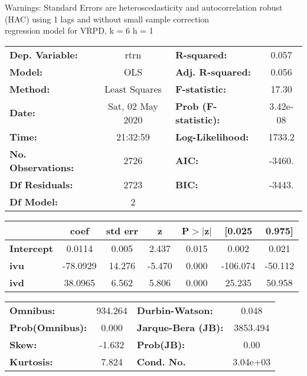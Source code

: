 Warnings: \newline
 [1] Standard Errors are heteroscedasticity and autocorrelation robust (HAC) using 1 lags and without small sample correction\\ 

regression model for VRPD, k = 6 h = 1\begin{center}
\begin{tabular}{lclc}
\toprule
\textbf{Dep. Variable:}    &       rtrn       & \textbf{  R-squared:         } &     0.057   \\
\textbf{Model:}            &       OLS        & \textbf{  Adj. R-squared:    } &     0.056   \\
\textbf{Method:}           &  Least Squares   & \textbf{  F-statistic:       } &     17.30   \\
\textbf{Date:}             & Sat, 02 May 2020 & \textbf{  Prob (F-statistic):} &  3.42e-08   \\
\textbf{Time:}             &     21:32:59     & \textbf{  Log-Likelihood:    } &    1733.2   \\
\textbf{No. Observations:} &        2726      & \textbf{  AIC:               } &    -3460.   \\
\textbf{Df Residuals:}     &        2723      & \textbf{  BIC:               } &    -3443.   \\
\textbf{Df Model:}         &           2      & \textbf{                     } &             \\
\bottomrule
\end{tabular}
\begin{tabular}{lcccccc}
                   & \textbf{coef} & \textbf{std err} & \textbf{z} & \textbf{P$> |$z$|$} & \textbf{[0.025} & \textbf{0.975]}  \\
\midrule
\textbf{Intercept} &       0.0114  &        0.005     &     2.437  &         0.015        &        0.002    &        0.021     \\
\textbf{ivu}       &     -78.0929  &       14.276     &    -5.470  &         0.000        &     -106.074    &      -50.112     \\
\textbf{ivd}       &      38.0965  &        6.562     &     5.806  &         0.000        &       25.235    &       50.958     \\
\bottomrule
\end{tabular}
\begin{tabular}{lclc}
\textbf{Omnibus:}       & 934.264 & \textbf{  Durbin-Watson:     } &    0.048  \\
\textbf{Prob(Omnibus):} &   0.000 & \textbf{  Jarque-Bera (JB):  } & 3853.494  \\
\textbf{Skew:}          &  -1.632 & \textbf{  Prob(JB):          } &     0.00  \\
\textbf{Kurtosis:}      &   7.824 & \textbf{  Cond. No.          } & 3.04e+03  \\
\bottomrule
\end{tabular}
\end{center}

